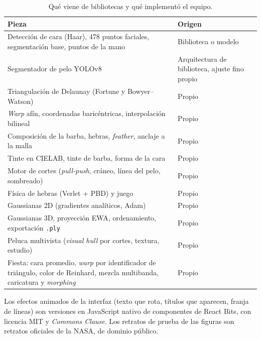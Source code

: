 \begin{table}[ht]
\centering
\small
\begin{tabularx}{\linewidth}{@{}X l@{}}
\toprule
Pieza & Origen \\
\midrule
Detección de cara (Haar), 478 puntos faciales, segmentación base, puntos de la mano & Biblioteca o modelo \\
Segmentador de pelo YOLOv8 & Arquitectura de biblioteca, ajuste fino propio \\
Triangulación de Delaunay (Fortune y Bowyer--Watson) & Propio \\
\emph{Warp} afín, coordenadas baricéntricas, interpolación bilineal & Propio \\
Composición de la barba, hebras, \emph{feather}, anclaje a la malla & Propio \\
Tinte en CIELAB, tinte de barba, forma de la cara & Propio \\
Motor de cortes (\emph{pull-push}, cráneo, línea del pelo, sombreado) & Propio \\
Física de hebras (Verlet + PBD) y juego & Propio \\
Gaussianas 2D (gradientes analíticos, Adam) & Propio \\
Gaussianas 3D, proyección EWA, ordenamiento, exportación \texttt{.ply} & Propio \\
Peluca multivista (\emph{visual hull} por cortes, textura, estudio) & Propio \\
Fiesta: cara promedio, \emph{warp} por identificador de triángulo, color de Reinhard, mezcla multibanda, caricatura y \emph{morphing} & Propio \\
\bottomrule
\end{tabularx}
\caption{Qué viene de bibliotecas y qué implementó el equipo.}
\label{tab:propio}
\end{table}

Los efectos animados de la interfaz (texto que rota, títulos que aparecen, franja de líneas) son versiones en JavaScript nativo de componentes de React Bits, con licencia MIT y \emph{Commons Clause}. Los retratos de prueba de las figuras son retratos oficiales de la NASA, de dominio público.
